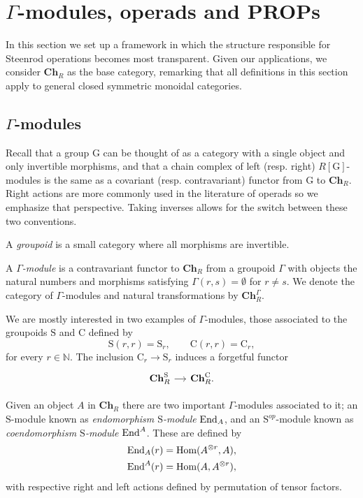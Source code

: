 
\section{$\Gamma$-modules, operads and PROPs} \label{s:operads}

In this section we set up a framework in which the structure responsible for Steenrod operations becomes most transparent. Given our applications, we consider $\mathbf{Ch}_R$ as the base category, remarking that all definitions in this section apply to general closed symmetric monoidal categories.

\subsection{$\Gamma$-modules}
Recall that a group $\mathrm G$ can be thought of as a category with a single object and only invertible morphisms, and that a chain complex of left (resp. right) $R[\mathrm G]$-modules is the same as a covariant (resp. contravariant) functor from $\mathrm G$ to $\mathbf{Ch}_R$. Right actions are more commonly used in the literature of operads so we emphasize that perspective. Taking inverses allows for the switch between these two conventions. 

A \textit{groupoid} is a small category where all morphisms are invertible.
\begin{definition}
	A \textit{$\Gamma$-module} is a contravariant functor to $\mathbf{Ch}_R$ from a groupoid $\Gamma$ with objects the natural numbers and morphisms satisfying $\Gamma(r,s) = \emptyset$ for $r \neq s$. We denote the category of $\Gamma$-modules and natural transformations by $\mathbf{Ch}_R^\Gamma$.
\end{definition}

We are mostly interested in two examples of $\Gamma$-modules, those associated to the groupoids $\mathrm{S}$ and $\mathrm{C}$ defined by
\begin{equation*}
\mathrm{S}(r, r) = \mathrm{S}_r, \qquad
\mathrm{C}(r,r) = \mathrm{C}_r,
\end{equation*}
for every $r \in \mathbb{N}$. The inclusion $\mathrm{C}_r \to \mathrm{S}_r$ induces a forgetful functor
\begin{equation*}
\begin{tikzcd} [column sep = small]
\mathbf{Ch}_R^\mathrm{S}  \arrow[r] & \mathbf{Ch}_R^\mathrm{C}.
\end{tikzcd}
\end{equation*}

Given an object $A$ in $\mathbf{Ch}_R$ there are two important $\Gamma$-modules associated to it; an $\mathrm{S}$-module known as \textit{endomorphism $\mathrm{S}$-module} $\mathrm{End}_A$, and an $\mathrm{S}^{op}$-module known as \textit{coendomorphism $\mathrm{S}$-module} $\mathrm{End}^A$. These are defined by
\begin{align*}	
\mathrm{End}_A(r) &= \mathrm{Hom}(A^{\otimes r},A), \\
\mathrm{End}^A(r) &= \mathrm{Hom}(A,A^{\otimes r}),
\end{align*}
with respective right and left actions defined by permutation of tensor factors. 

